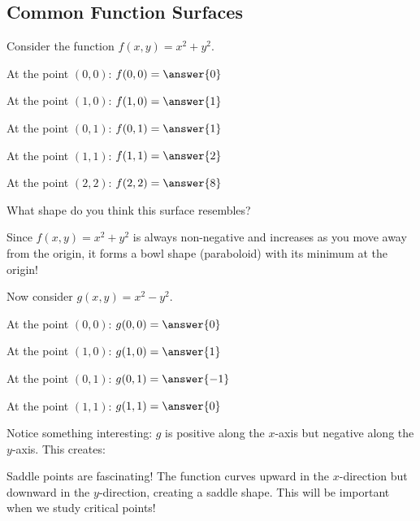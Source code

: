 \documentclass{ximera}
\begin{document}
\subsection*{Common Function Surfaces}

\begin{problem}
Consider the function $f(x, y) = x^2 + y^2$. 

At the point $(0, 0)$: $f(0, 0) = \answer{0}$

At the point $(1, 0)$: $f(1, 0) = \answer{1}$

At the point $(0, 1)$: $f(0, 1) = \answer{1}$

At the point $(1, 1)$: $f(1, 1) = \answer{2}$

At the point $(2, 2)$: $f(2, 2) = \answer{8}$

What shape do you think this surface resembles?
\begin{multipleChoice}
\end{multipleChoice}

\begin{feedback}
Since $f(x,y) = x^2 + y^2$ is always non-negative and increases as you move away from the origin, it forms a bowl shape (paraboloid) with its minimum at the origin!
\end{feedback}
\end{problem}

\begin{problem}
Now consider $g(x, y) = x^2 - y^2$.

At the point $(0, 0)$: $g(0, 0) = \answer{0}$

At the point $(1, 0)$: $g(1, 0) = \answer{1}$

At the point $(0, 1)$: $g(0, 1) = \answer{-1}$

At the point $(1, 1)$: $g(1, 1) = \answer{0}$

Notice something interesting: $g$ is positive along the $x$-axis but negative along the $y$-axis. This creates:
\begin{multipleChoice}
\end{multipleChoice}

\begin{feedback}
Saddle points are fascinating! The function curves upward in the $x$-direction but downward in the $y$-direction, creating a saddle shape. This will be important when we study critical points!
\end{feedback}
\end{problem}
\end{document}
